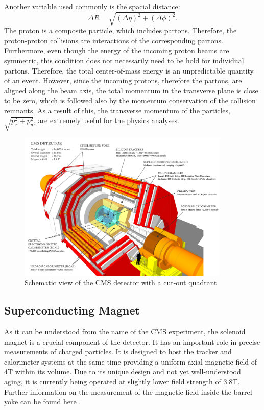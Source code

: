 Another variable used commonly is the spacial distance:
\begin{equation}
  \label{eqn:DR}
   \Delta R = \sqrt{(\Delta\eta)^2+(\Delta\phi)^2}.
\end{equation}
The proton is a composite particle, which includes partons. Therefore, the proton-proton collisions are interactions of the corresponding partons. Furthermore, even though the energy of the incoming proton beams are symmetric, this condition does not necessarily need to be hold for individual partons. Therefore, the total center-of-mass energy is an unpredictable quantity of an event. However, since the incoming protons, therefore the partons, are aligned along the beam axis, the total momentum in the transverse
plane is close to be zero, which is followed also by the momentum conservation of the collision remnants. As a result of this, the transverse momentum of the particles, $\sqrt{p^2_x+p^2_y}$, are extremely useful for the physics analyses.
\begin{figure}
\begin{center}
\includegraphics[width=0.9\textwidth]{Plots/CMS/CMS.jpg}
\caption{\label{fig:CMS} Schematic view of the CMS detector with a cut-out quadrant \cite{CMS_Vis}}
\end{center}
\end{figure}
\subsection{Superconducting Magnet}
As it can be understood from the name of the CMS experiment, the solenoid magnet is a crucial component of the detector. It has an important role in precise measurements of charged particles. It is designed to host the tracker and calorimeter systems at the same time providing a uniform axial magnetic field of 4T within its volume. Due to its unique design and not yet well-understood aging, it is currently being operated at slightly lower field strength of 3.8T. Further information on the measurement of the magnetic field inside the  barrel yoke can be found here \cite{CMS_Mag}.

